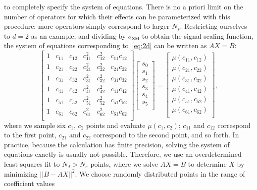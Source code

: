 to completely specify the system of equations. There is no a priori limit on the
number of operators for which their effects can be parameterized with this
procedure; more operators simply correspond to larger $N_s$. Restricting
ourselves to $d=2$ as an example, and dividing by $\sigma_\text{SM}$ to obtain
the signal scaling function, the system of equations corresponding
to~\cref{eq:2d} can be written as $AX = B$:
\[
  \begin{bmatrix}
    1 & c_{11} & c_{12} & c_{11}^2 & c_{12}^2 & c_{11}c_{12} \\
    1 & c_{21} & c_{22} & c_{21}^2 & c_{22}^2 & c_{21}c_{22} \\
    1 & c_{31} & c_{32} & c_{31}^2 & c_{32}^2 & c_{31}c_{32} \\
    1 & c_{41} & c_{42} & c_{41}^2 & c_{42}^2 & c_{41}c_{42} \\
    1 & c_{51} & c_{52} & c_{51}^2 & c_{52}^2 & c_{51}c_{52} \\
    1 & c_{61} & c_{62} & c_{61}^2 & c_{62}^2 & c_{61}c_{62} \\
  \end{bmatrix}
  \begin{bmatrix}
    s_0 \\
    s_1 \\
    s_2 \\
    s_3 \\
    s_4 \\
    s_5 \\
  \end{bmatrix}
   =
  \begin{bmatrix}
    \mu(c_{11}, c_{12}) \\
    \mu(c_{21}, c_{22}) \\
    \mu(c_{31}, c_{32}) \\
    \mu(c_{41}, c_{42}) \\
    \mu(c_{51}, c_{52}) \\
    \mu(c_{61}, c_{62}) \\
  \end{bmatrix},
\]
where we sample six $c_1$, $c_2$ points and evaluate $\mu(c_1, c_2)$; $c_{11}$
and $c_{12}$ correspond to the first point, $c_{21}$ and $c_{22}$ correspond to
the second point, and so forth. In practice, because the \madgraph calculation
has finite precision, solving the system of equations exactly is usually not
possible. Therefore, we use an overdetermined least-squares fit to $N_d > N_s$
points, where we solve $AX = B$ to determine $X$ by minimizing $||B - AX||^2$.
We choose randomly distributed points in the range of coefficient values
